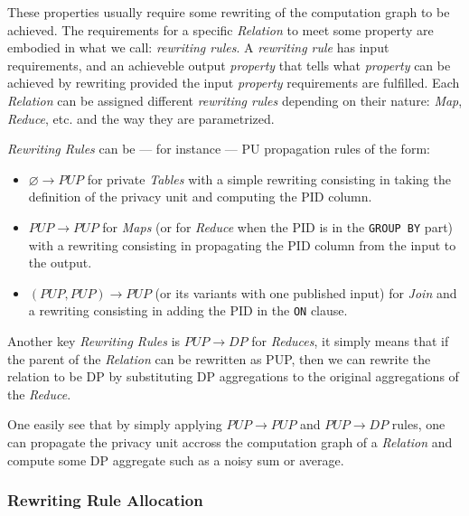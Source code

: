 \documentclass[letterpaper]{article} %
\begin{document}
These properties usually require some rewriting of the computation graph to be achieved. The requirements for a specific \emph{Relation} to meet some property are embodied in what we call: \emph{rewriting rules}.
A \emph{rewriting rule} has input requirements, and an achieveble output \emph{property} that tells what \emph{property} can be achieved by rewriting provided the input \emph{property} requirements are fulfilled.
Each \emph{Relation} can be assigned different \emph{rewriting rules} depending on their nature: \emph{Map}, \emph{Reduce}, etc. and the way they are parametrized.

\emph{Rewriting Rules} can be --- for instance --- PU propagation rules of the form:
\begin{itemize}
    \item $\varnothing \rightarrow PUP$ for private \emph{Tables} with a simple rewriting consisting in taking the definition of the privacy unit and computing the PID column.
    \item $PUP \rightarrow PUP$ for \emph{Maps} (or for \emph{Reduce} when the PID is in the \texttt{GROUP BY} part) with a rewriting consisting in propagating the PID column from the input to the output.
    \item $(PUP, PUP) \rightarrow PUP$ (or its variants with one published input) for \emph{Join} and a rewriting consisting in adding the PID in the \texttt{ON} clause.
\end{itemize}

Another key \emph{Rewriting Rules} is $PUP \rightarrow DP$ for \emph{Reduces}, it simply means that if the parent of the \emph{Relation} can be rewritten as PUP, then we can rewrite the relation to be DP by substituting DP aggregations to the original aggregations of the \emph{Reduce}.

One easily see that by simply applying $PUP \rightarrow PUP$ and $PUP \rightarrow DP$ rules, one can propagate the privacy unit accross the computation graph of a \emph{Relation} and compute some DP aggregate such as a noisy sum or average.

\subsubsection{Rewriting Rule Allocation}
\end{document}
